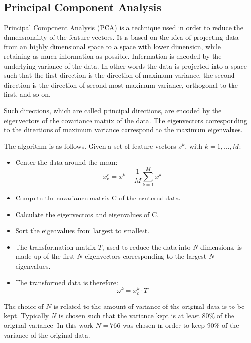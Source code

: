 \documentclass[journal,twocolumn]{IEEEtran}
\begin{document}
\subsection{Principal Component Analysis}

Principal Component Analysis (PCA) is a technique used in order to reduce the dimensionality of the feature vectors. It is based on the idea of projecting data from an highly dimensional space to a space with lower dimension, while retaining as much information as possible. Information is encoded by the underlying variance of the data. In other words the data is projected into a space such that the first direction is the direction of maximum variance, the second direction is the direction of second most maximum variance, orthogonal to the first, and so on.

Such directions, which are called principal directions, are encoded by the eigenvectors of the covariance matrix of the data. The eigenvectors corresponding to the directions of maximum variance correspond to the maximum eigenvalues.

The algorithm is as follows. Given a set of feature vectors $x^k$, with $k=1,\dots,M$:
\begin{itemize}
\item Center the data around the mean:
\begin{equation*}
x_c^k = x^k-\frac{1}{M}\sum\limits_{k=1}^Mx^k
\end{equation*}
\item Compute the covariance matrix C of the centered data.
\item Calculate the eigenvectors and eigenvalues of C.
\item Sort the eigenvalues from largest to smallest.
\item The transformation matrix $T$, used to reduce the data into $N$ dimensions, is made up of the first $N$ eigenvectors corresponding to the largest $N$ eigenvalues.
\item The transformed data is therefore:
\begin{equation*}
\omega^k=x_c^k\cdot T
\end{equation*}
\end{itemize}

The choice of $N$ is related to the amount of variance of the original data is to be kept. Typically $N$ is chosen such that the variance kept is at least 80\% of the original variance. In this work $N=766$ was chosen in order to keep 90\% of the variance of the original data.
\end{document}
